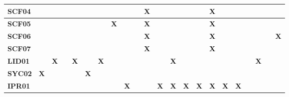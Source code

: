 \begin{center}
\begin{adjustbox}{max width=\textwidth,max totalheight=.82\textheight}
\begin{tabular}{|l|c|c|c|c|c|c|c|c|c|c|c|c|c|c|c|c|c|c|c|c|c|}
\rowcolor{azulClaro}
\textcolor{azulTEC}{\textbf{SCF04}} & \textbf{ } & \textbf{ } & \textbf{ } & \textbf{ } & \textbf{ } & \textbf{ } & \textbf{ } & \textbf{ } & \textbf{ } & \textbf{X} & \textbf{ } & \textbf{ } & \textbf{ } & \textbf{ } & \textbf{X} & \textbf{ } & \textbf{ } & \textbf{ } & \textbf{ } & \textbf{ } & \textbf{ } \\ \hline
\rowcolor{azulClaro}
\textcolor{azulTEC}{\textbf{SCF05}} & \textbf{ } & \textbf{ } & \textbf{ } & \textbf{ } & \textbf{ } & \textbf{ } & \textbf{X} & \textbf{ } & \textbf{ } & \textbf{X} & \textbf{ } & \textbf{ } & \textbf{ } & \textbf{ } & \textbf{X} & \textbf{ } & \textbf{ } & \textbf{ } & \textbf{ } & \textbf{ } & \textbf{ } \\ \hline
\rowcolor{azulClaro}
\textcolor{azulTEC}{\textbf{SCF06}} & \textbf{ } & \textbf{ } & \textbf{ } & \textbf{ } & \textbf{ } & \textbf{ } & \textbf{ } & \textbf{ } & \textbf{ } & \textbf{X} & \textbf{ } & \textbf{ } & \textbf{ } & \textbf{ } & \textbf{X} & \textbf{ } & \textbf{ } & \textbf{ } & \textbf{ } & \textbf{ } & \textbf{X} \\ \hline
\rowcolor{azulClaro}
\textcolor{azulTEC}{\textbf{SCF07}} & \textbf{ } & \textbf{ } & \textbf{ } & \textbf{ } & \textbf{ } & \textbf{ } & \textbf{ } & \textbf{ } & \textbf{ } & \textbf{X} & \textbf{ } & \textbf{ } & \textbf{ } & \textbf{ } & \textbf{X} & \textbf{ } & \textbf{ } & \textbf{ } & \textbf{ } & \textbf{ } & \textbf{ } \\ \hline
\rowcolor{azulClaro}
\textcolor{azulTEC}{\textbf{LID01}} & \textbf{ } & \textbf{X} & \textbf{ } & \textbf{X} & \textbf{ } & \textbf{X} & \textbf{ } & \textbf{ } & \textbf{ } & \textbf{ } & \textbf{ } & \textbf{X} & \textbf{ } & \textbf{ } & \textbf{ } & \textbf{ } & \textbf{ } & \textbf{ } & \textbf{X} & \textbf{ } & \textbf{ } \\ \hline
\rowcolor{azulClaro}
\textcolor{azulTEC}{\textbf{SYC02}} & \textbf{X} & \textbf{ } & \textbf{ } & \textbf{ } & \textbf{X} & \textbf{ } & \textbf{ } & \textbf{ } & \textbf{ } & \textbf{ } & \textbf{ } & \textbf{ } & \textbf{ } & \textbf{ } & \textbf{ } & \textbf{ } & \textbf{ } & \textbf{ } & \textbf{ } & \textbf{ } & \textbf{ } \\ \hline
\rowcolor{azulClaro}
\textcolor{azulTEC}{\textbf{IPR01}} & \textbf{ } & \textbf{ } & \textbf{ } & \textbf{ } & \textbf{ } & \textbf{ } & \textbf{ } & \textbf{X} & \textbf{ } & \textbf{ } & \textbf{X} & \textbf{X} & \textbf{X} & \textbf{X} & \textbf{X} & \textbf{X} & \textbf{X} & \textbf{ } & \textbf{ } & \textbf{ } & \textbf{ } \\ \hline
\end{tabular}
\end{adjustbox}
\end{center}

